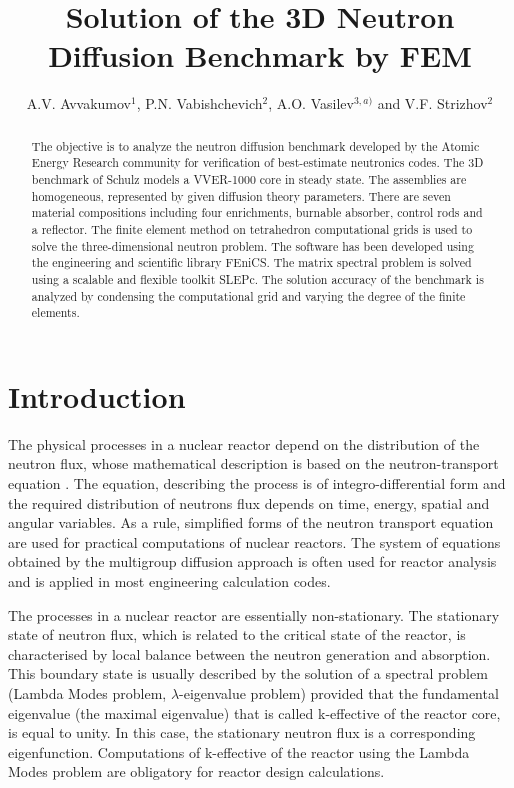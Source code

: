 \documentclass[runningheads,a4paper]{llncs}
\title{Solution of the 3D Neutron Diffusion Benchmark by FEM}
\author{A.V. Avvakumov$^{1}$, P.N. Vabishchevich$^{2}$, A.O. Vasilev$^{3,a)}$ and V.F. Strizhov$^{2}$}
\institute{$^1$National Research Center \emph{Kurchatov Institute}, Moscow, Russia \\
$^2$Nuclear Safety Institute of RAS,  Moscow, Russia \\
$^3$North-Eastern Federal University, Yakutsk, Russia\\
$^{a)}$Corresponding author: \url{haska87@gmail.com}}
\newcommand{\keywords}[1]{\par\addvspace\baselineskip
\noindent\keywordname\enspace\ignorespaces#1}
\begin{document}
\maketitle

\begin{abstract}
The objective is to analyze the neutron diffusion benchmark developed by the Atomic Energy Research community for verification of best-estimate neutronics codes. 
The 3D benchmark of Schulz models a VVER-1000 core in steady state. 
The assemblies are homogeneous, represented by given diffusion theory parameters. 
There are seven material compositions including four enrichments, burnable absorber, control rods and a reflector. 
The finite element method on tetrahedron computational grids is used to solve the three-dimensional neutron problem. 
The software has been developed using the engineering and scientific library FEniCS. 
The matrix spectral problem is solved using a scalable and flexible toolkit SLEPc. 
The solution accuracy of the benchmark is analyzed by condensing the computational grid and varying the degree of the finite elements.
\end{abstract}



\section{Introduction}
The physical processes in a nuclear reactor \cite{duderstadt1976nuclear}
depend on the distribution of the neutron flux, whose mathematical description is based on the neutron-transport equation \cite{hetrick1971dynamics,stacey2007}. 
The equation, describing the process is of integro-differential form and the required distribution of neutrons flux depends on time, energy, spatial and angular variables. As a rule, simplified forms of the neutron transport equation are used for practical computations of nuclear reactors. The system of equations obtained by the multigroup diffusion approach is often used for reactor analysis \cite{marchuk1986numerical,lewis1993computational} and is applied in most engineering calculation codes.

The processes in a nuclear reactor are essentially non-stationary. The stationary state of neutron flux, which is related to the critical state of the reactor, is characterised by local balance between the neutron generation and absorption. This boundary state is usually described by the solution of a spectral problem (Lambda Modes problem, $\lambda$-eigenvalue problem) provided that the fundamental eigenvalue (the maximal eigenvalue) that is called k-effective of the reactor core, is equal to unity. In this case, the stationary neutron flux is a corresponding eigenfunction. Computations of k-effective of the reactor using the Lambda Modes problem are obligatory for reactor design calculations.
\end{document}
